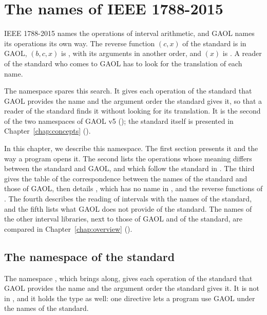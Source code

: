 \documentclass[12pt,a4paper,twoside,openright]{book}
\begin{document}
\chapter{The names of IEEE 1788-2015}\label{chap:ieee1788}
%

IEEE 1788-2015 \cite{IEEE1788:2015} names the operations of interval
arithmetic, and GAOL names its operations its own way. The reverse function
$(c,x)$ of the standard is  in GAOL,
$(b,c,x)$ is , with its arguments in
another order, and $(x)$ is
. A reader of the standard who comes to GAOL
has to look for the translation of each name.

\medskip
The namespace  spares this search. It gives each
operation of the standard that GAOL provides the name and the argument order
the standard gives it, so that a reader of the standard finds it without
looking for its translation. It is the second of the two namespaces of GAOL
v5 (); the standard itself is presented in
Chapter~\ref{chap:concepts} ().

\medskip
In this chapter, we describe this namespace. The first section presents it
and the way a program opens it. The second lists the operations whose
meaning differs between the standard and GAOL, and which follow the standard
in . The third gives the table of the correspondence
between the names of the standard and those of GAOL, then details
, which has no name in , and the reverse
functions of . The fourth describes the reading of intervals
with the names of the standard, and the fifth lists what GAOL does not
provide of the standard. The names of the other interval libraries, next to
those of GAOL and of the standard, are compared in
Chapter~\ref{chap:overview} ().

\section{The namespace of the standard}\label{sec:ieee1788-namespace}

The namespace , which  brings along,
gives each operation of the standard that GAOL provides the name and the
argument order the standard gives it. It is not in , and it holds
the type  as well: one directive lets a program use GAOL under
the names of the standard.\newinvfive
\end{document}
